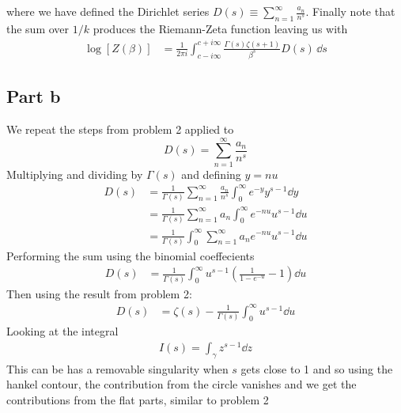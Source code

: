 \documentclass[a4paper,12pt]{article}
\begin{document}
where we have defined the Dirichlet series $D(s)\equiv\sum_{n=1}^{\infty}\frac{a_n}{n^s}$. Finally note that the sum over $1/k$ produces the Riemann-Zeta function leaving us with
\begin{equation}
	\begin{aligned}
		\log [Z(\beta)]
		&=\frac{1}{2\pi i}\int_{c-i\infty}^{c+i\infty}\frac{\Gamma(s)\zeta(s+1)}{\beta^s}D(s)\,\dd s 
	\end{aligned}
\end{equation}
\subsection*{Part b}
We repeat the steps from problem 2 applied to
\begin{equation}
D(s)=\sum_{n=1}^{\infty} \frac{a_n}{n^s}
\end{equation}
Multiplying and dividing by $\Gamma(s)$ and defining $y=nu$
\begin{equation}
	\begin{aligned}
		D(s)&=\frac{1}{\Gamma(s)}\sum_{n=1}^{\infty}\frac{a_n}{n^s}\int_{0}^{\infty}e^{-y}y^{s-1}\dd y\\
		&=\frac{1}{\Gamma(s)}\sum_{n=1}^{\infty}a_n\int_{0}^{\infty}e^{-nu}u^{s-1}\dd u\\
		&=\frac{1}{\Gamma(s)}\int_{0}^{\infty}\sum_{n=1}^{\infty}a_ne^{-nu}u^{s-1}\dd u
	\end{aligned}
\end{equation}
Performing the sum using the binomial coeffecients
\begin{equation}
	\begin{aligned}
		D(s)
		&=\frac{1}{\Gamma(s)}\int_{0}^{\infty}u^{s-1}\left(\frac{1}{1-e^{-u}}-1\right)
		\dd u
	\end{aligned}
\end{equation}
Then using the result from problem 2:
\begin{equation}
	\begin{aligned}
		D(s)
		&=\zeta(s)-\frac{1}{\Gamma(s)}\int_{0}^{\infty}u^{s-1}
		\dd u
	\end{aligned}
\end{equation}
Looking at the integral
\begin{equation}
	\begin{aligned}
I(s)=\int_\gamma z^{s-1}
		\dd z
	\end{aligned}
\end{equation}
This can be has a removable singularity when $s$ gets close to 1 and so using the hankel contour, the contribution from the circle vanishes and we get the contributions from the flat parts, similar to problem 2
\end{document}
